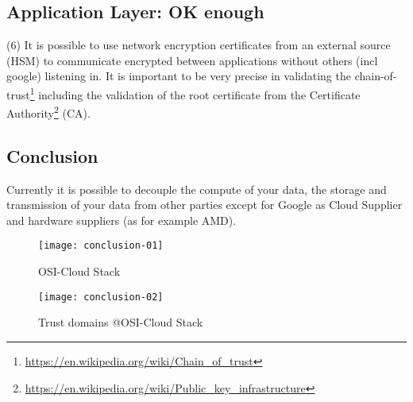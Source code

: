 \subsection*{Application Layer: OK enough}
(6) It is possible to use network encryption certificates from an external source (HSM) to communicate encrypted between applications without others (incl google) listening in. It is important to be very precise in validating the chain-of-trust\footnote{\url{ https://en.wikipedia.org/wiki/Chain_of_trust}} including the validation of the root certificate from the 
Certificate Authority\footnote{\url{https://en.wikipedia.org/wiki/Public_key_infrastructure}} (CA). 

\newpage
\subsection*{Conclusion}
Currently it is possible to decouple the compute of your data, the storage and transmission of your data from other parties except for Google as Cloud Supplier and hardware suppliers (as for example AMD). 

\begin{figure}[!ht]
    \centering
    \texttt{[image: conclusion-01]}
    \caption{OSI-Cloud Stack}
    \label{fig:conclusion-01}
\end{figure}

\begin{figure}[!ht]
    \centering
    \texttt{[image: conclusion-02]}
    \caption{Trust domains @OSI-Cloud Stack}
    \label{fig:conclusion-02}
\end{figure}